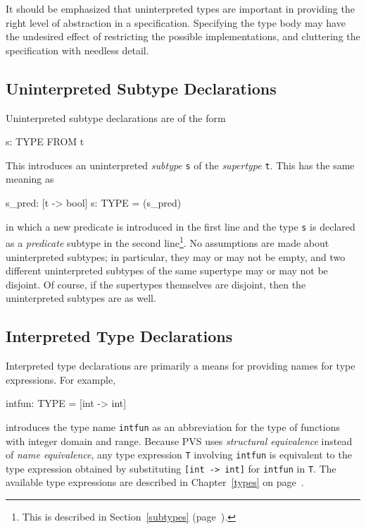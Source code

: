 It should be emphasized that uninterpreted types are important in
providing the right level of abstraction in a specification.  Specifying
the type body may have the undesired effect of restricting the possible
implementations, and cluttering the specification with needless detail.



\subsection{Uninterpreted Subtype Declarations}

Uninterpreted subtype declarations are of the form
\begin{pvsex}
  s: TYPE FROM t
\end{pvsex}
This introduces an uninterpreted
\emph{subtype} \texttt{s} of
the \emph{supertype}
\texttt{t}.  This has the same meaning as
\begin{pvsex}
  s_pred: [t -> bool]
  s: TYPE = (s_pred)
\end{pvsex}
%
in which a new predicate is introduced in the first line and the type
\texttt{s} is declared as a \emph{predicate} subtype in the second
line\footnote{This is described in Section~\ref{subtypes}
(page~\pageref{subtypes}).}.  No assumptions are made about uninterpreted
subtypes; in particular, they may or may not be empty, and two different
uninterpreted subtypes of the same supertype may or may not be disjoint.
Of course, if the supertypes themselves are disjoint, then the
uninterpreted subtypes are as well.


\subsection{Interpreted Type Declarations}

Interpreted type declarations are primarily a means for providing names
for type expressions.  For example,
\begin{pvsex}
  intfun: TYPE = [int -> int]
\end{pvsex}
%
introduces the type name \texttt{intfun} as an abbreviation for the type
of functions with integer domain and range.  Because PVS uses
\emph{structural equivalence} instead of
\emph{name equivalence}, any type expression
\texttt{T} involving \texttt{intfun} is equivalent to the type expression
obtained by substituting \texttt{[int -> int]} for \texttt{intfun} in
\texttt{T}.  The available type expressions are described in
Chapter~\ref{types} on page~\pageref{types}.

